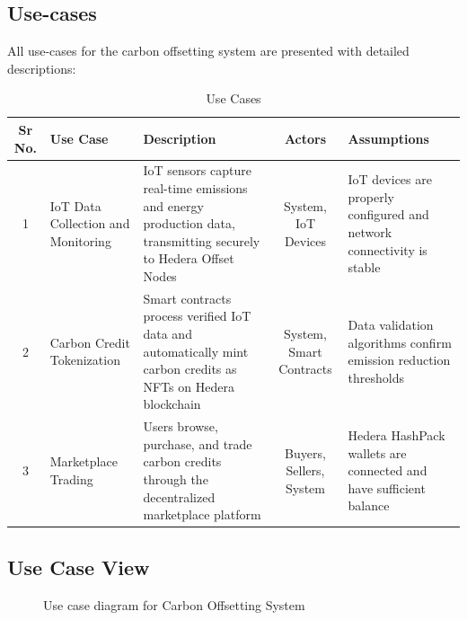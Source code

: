 \documentclass[oneside,a4paper,12pt]{book}
\renewcommand{\arraystretch}{1.5}
\begin{document}
\subsection{Use-cases}
All use-cases for the carbon offsetting system are presented with detailed descriptions:

\begin{table}[!htbp]
\begin{center}
\def\arraystretch{1.5}
\begin{tabularx}{\textwidth}{| c | X | X | c | X |}
\hline
Sr No.	& Use Case	& Description	& Actors	& Assumptions \\
\hline
1& IoT Data Collection and Monitoring & IoT sensors capture real-time emissions and energy production data, transmitting securely to Hedera Offset Nodes & System, IoT Devices & IoT devices are properly configured and network connectivity is stable \\
\hline
2& Carbon Credit Tokenization & Smart contracts process verified IoT data and automatically mint carbon credits as NFTs on Hedera blockchain & System, Smart Contracts & Data validation algorithms confirm emission reduction thresholds \\
\hline
3& Marketplace Trading & Users browse, purchase, and trade carbon credits through the decentralized marketplace platform & Buyers, Sellers, System & Hedera HashPack wallets are connected and have sufficient balance \\
\hline
\end{tabularx}
\end{center}
\caption{Use Cases}
\label{tab:usecase}
\end{table}


\newpage
\subsection{Use Case View}
\begin{center}
    \begin{figure}[!htbp]
        \centering
      \caption{Use case diagram for Carbon Offsetting System}
      \label{fig:usecase}
    \end{figure}
\end{center}  
\end{document}
